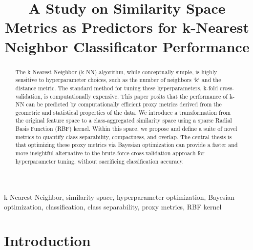 \documentclass[conference]{IEEEtran}
\begin{document}
\title{A Study on Similarity Space Metrics as Predictors for k-Nearest Neighbor Classificator Performance}

\author{
}

\maketitle

\begin{abstract}
The k-Nearest Neighbor (k-NN) algorithm, while conceptually simple, is highly sensitive to hyperparameter choices, such as the number of neighbors `k` and the distance metric. The standard method for tuning these hyperparameters, k-fold cross-validation, is computationally expensive. This paper posits that the performance of k-NN can be predicted by computationally efficient proxy metrics derived from the geometric and statistical properties of the data. We introduce a transformation from the original feature space to a class-aggregated similarity space using a sparse Radial Basis Function (RBF) kernel. Within this space, we propose and define a suite of novel metrics to quantify class separability, compactness, and overlap. The central thesis is that optimizing these proxy metrics via Bayesian optimization can provide a faster and more insightful alternative to the brute-force cross-validation approach for hyperparameter tuning, without sacrificing classification accuracy.
\end{abstract}

\begin{IEEEkeywords}
k-Nearest Neighbor, similarity space, hyperparameter optimization, Bayesian optimization, classification, class separability, proxy metrics, RBF kernel
\end{IEEEkeywords}

\section{Introduction}
\end{document}

